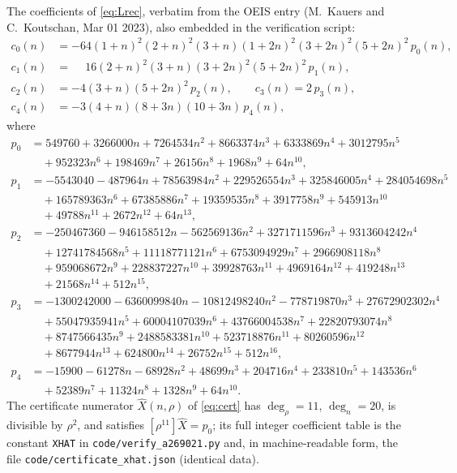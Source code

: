 \documentclass[11pt]{article}
\theoremstyle{plain}
\theoremstyle{definition}
\theoremstyle{remark}
\newcommand{\Xh}{\widehat{X}}
\begin{document}
The coefficients of \eqref{eq:Lrec}, verbatim from the OEIS entry (M.~Kauers and C.~Koutschan,
Mar 01 2023), also embedded in the verification script:
{\small
\begin{align*}
c_0(n)&=-64(1{+}n)^2(2{+}n)^2(3{+}n)(1{+}2n)^2(3{+}2n)^2(5{+}2n)^2\,p_0(n),\\
c_1(n)&=\phantom{-}16(2{+}n)^2(3{+}n)(3{+}2n)^2(5{+}2n)^2\,p_1(n),\\
c_2(n)&=-4(3{+}n)(5{+}2n)^2\,p_2(n),\qquad
c_3(n)=2\,p_3(n),\\
c_4(n)&=-3(4{+}n)(8{+}3n)(10{+}3n)\,p_4(n),
\end{align*}
where
\begin{align*}
p_0&=549760+3266000n+7264534n^2+8663374n^3+6333869n^4+3012795n^5\\
   &\quad+952323n^6+198469n^7+26156n^8+1968n^9+64n^{10},\\
p_1&=-5543040-487964n+78563984n^2+229526554n^3+325846005n^4+284054698n^5\\
   &\quad+165789363n^6+67385886n^7+19359535n^8+3917758n^9+545913n^{10}\\
   &\quad+49788n^{11}+2672n^{12}+64n^{13},\\
p_2&=-250467360-946158512n-562569136n^2+3271711596n^3+9313604242n^4\\
   &\quad+12741784568n^5+11118771121n^6+6753094929n^7+2966908118n^8\\
   &\quad+959068672n^9+228837227n^{10}+39928763n^{11}+4969164n^{12}+419248n^{13}\\
   &\quad+21568n^{14}+512n^{15},\\
p_3&=-1300242000-6360099840n-10812498240n^2-778719870n^3+27672902302n^4\\
   &\quad+55047935941n^5+60004107039n^6+43766004538n^7+22820793074n^8\\
   &\quad+8747566435n^9+2488583381n^{10}+523718876n^{11}+80260596n^{12}\\
   &\quad+8677944n^{13}+624800n^{14}+26752n^{15}+512n^{16},\\
p_4&=-15900-61278n-68928n^2+48699n^3+204716n^4+233810n^5+143536n^6\\
   &\quad+52389n^7+11324n^8+1328n^9+64n^{10}.
\end{align*}
}%
The certificate numerator $\Xh(n,\rho)$ of \eqref{eq:cert} has
$\deg_\rho=11$, $\deg_n=20$, is divisible by $\rho^2$, and satisfies
$[\rho^{11}]\Xh=p_0$; its full integer coefficient table is the constant \texttt{XHAT} in
\texttt{code/verify\_a269021.py} and, in machine-readable form, the file
\texttt{code/certificate\_xhat.json} (identical data).
\end{document}

